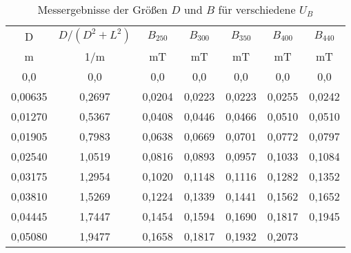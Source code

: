 



%


\begin{table}[h!]
  \centering
  \caption{Messergebnisse der Größen $D$ und $B$ für verschiedene $U_B$}
  \label{tab:V502}
  \begin{tabular}{c c c c c c c}
    \toprule
    D & $D/(D^2+L^2)$ & $B_{250}$ & $B_{300}$ & $B_{350}$ & $B_{400}$ & $B_{440}$\\
    m & 1/m &   mT &     mT &    mT &     mT &    mT   \\
    \midrule
    0,0 &     0,0		    &  0,0     & 0,0    & 0,0    & 0,0    & 0,0   \\
    0,00635 &   0,2697    &  0,0204  & 0,0223 & 0,0223 & 0,0255 & 0,0242\\
    0,01270 &   0,5367		&  0,0408  & 0,0446 & 0,0466 & 0,0510 & 0,0510\\
    0,01905 &   0,7983		&  0,0638  & 0,0669 & 0,0701 & 0,0772 & 0,0797\\
    0,02540 &   1,0519		&  0,0816  & 0,0893 & 0,0957 & 0,1033 & 0,1084\\
    0,03175 &   1,2954		&  0,1020  & 0,1148 & 0,1116 & 0,1282 & 0,1352\\
    0,03810 &   1,5269		&  0,1224  & 0,1339 & 0,1441 & 0,1562 & 0,1652\\
    0,04445 &   1,7447		&  0,1454  & 0,1594 & 0,1690 & 0,1817 & 0,1945\\
    0,05080 &   1,9477		&  0,1658  & 0,1817 & 0,1932 & 0,2073 &       \\












    \bottomrule
  \end{tabular}
\end{table}

%
